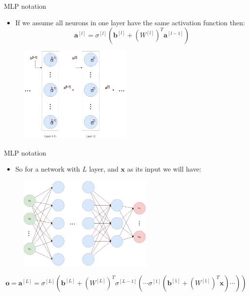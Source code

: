 \begin{frame}{MLP notation}
    \begin{itemize}
        \item If we assume all neurons in one layer have the same activation function then:
        \[
        \bm{a}^{[l]} = \sigma^{[l]}\left(\bm{b}^{[l]} +  (W^{[l]})^T\bm{a}^{[l-1]}\right)
        \]
    \end{itemize}
    \begin{figure}[H]
        \centering
        \includegraphics[width=0.5\textwidth]{Figs/notation5.png}
    \end{figure}
\end{frame}

\begin{frame}{MLP notation}
    \begin{itemize}
        \item So for a network with $L$ layer, and $\bm{x}$ as its input we will have:
    \end{itemize}
    \begin{figure}[H]
        \centering
        \includegraphics[width=0.6\textwidth]{Figs/notation6.png}
    \end{figure}
    \[
    \bm{o}=\bm{a}^{[L]}=\sigma^{[L]}\left(\bm{b}^{[L]} + (W^{[L]})^T\sigma^{[L-1]}\left(\cdots\sigma^{[1]}\left(\bm{b}^{[1]}+(W^{[1]})^T\bm{x}\right)\cdots \right)\right)
    \]
\end{frame}


